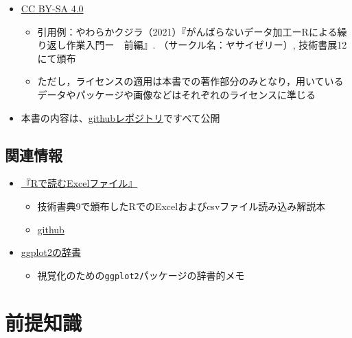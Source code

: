 \documentclass[
  xelatex,ja=standard, b5paper]{bxjsbook}
\providecommand{\tightlist}{%
  \setlength{\itemsep}{0pt}\setlength{\parskip}{0pt}}
\begin{document}
\begin{itemize}
\tightlist
\item
  \href{https://creativecommons.org/licenses/by-sa/4.0/}{CC BY-SA 4.0}

  \begin{itemize}
  \tightlist
  \item
    引用例：やわらかクジラ（2021）『がんばらないデータ加工ーRによる繰り返し作業入門ー　前編』. （サークル名：ヤサイゼリー）, 技術書展12にて頒布
  \item
    ただし，ライセンスの適用は本書での著作部分のみとなり，用いているデータやパッケージや画像などはそれぞれのライセンスに準じる
  \end{itemize}
\item
  本書の内容は、\href{https://github.com/izunyan/gisho12}{githubレポジトリ}ですべて公開
\end{itemize}

\hypertarget{association}{%
\section*{関連情報}\label{association}}

\begin{itemize}
\tightlist
\item
  \href{https://techbookfest.org/product/4794168259903488?productVariantID=5913872206659584}{『Rで読むExcelファイル』}

  \begin{itemize}
  \tightlist
  \item
    技術書典9で頒布したRでのExcelおよびcsvファイル読み込み解説本
  \item
    \href{https://izunyan.github.io/excel_r/}{github}
  \end{itemize}
\item
  \href{https://izunyan.github.io/practice_ggplot2/}{ggplot2の辞書}

  \begin{itemize}
  \tightlist
  \item
    視覚化のための\texttt{ggplot2}パッケージの辞書的メモ
  \end{itemize}
\end{itemize}

\hypertarget{premise}{%
\chapter{前提知識}\label{premise}}
\end{document}
